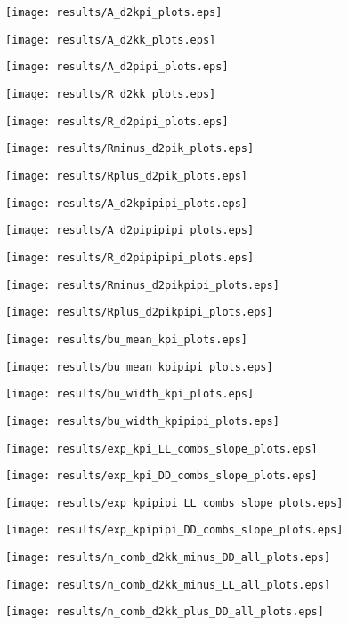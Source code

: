 \documentclass[11pt,a4paper]{article}
\begin{document}
\texttt{[image: results/A\_d2kpi\_plots.eps]}

\texttt{[image: results/A\_d2kk\_plots.eps]}

\texttt{[image: results/A\_d2pipi\_plots.eps]}

\texttt{[image: results/R\_d2kk\_plots.eps]}

\texttt{[image: results/R\_d2pipi\_plots.eps]}

\texttt{[image: results/Rminus\_d2pik\_plots.eps]}

\texttt{[image: results/Rplus\_d2pik\_plots.eps]}

\texttt{[image: results/A\_d2kpipipi\_plots.eps]}

\texttt{[image: results/A\_d2pipipipi\_plots.eps]}

\texttt{[image: results/R\_d2pipipipi\_plots.eps]}

\texttt{[image: results/Rminus\_d2pikpipi\_plots.eps]}

\texttt{[image: results/Rplus\_d2pikpipi\_plots.eps]}

\texttt{[image: results/bu\_mean\_kpi\_plots.eps]}

\texttt{[image: results/bu\_mean\_kpipipi\_plots.eps]}

\texttt{[image: results/bu\_width\_kpi\_plots.eps]}

\texttt{[image: results/bu\_width\_kpipipi\_plots.eps]}

\texttt{[image: results/exp\_kpi\_LL\_combs\_slope\_plots.eps]}

\texttt{[image: results/exp\_kpi\_DD\_combs\_slope\_plots.eps]}

\texttt{[image: results/exp\_kpipipi\_LL\_combs\_slope\_plots.eps]}

\texttt{[image: results/exp\_kpipipi\_DD\_combs\_slope\_plots.eps]}

\iffalse
\texttt{[image: results/n\_comb\_d2kk\_minus\_DD\_all\_plots.eps]}

\texttt{[image: results/n\_comb\_d2kk\_minus\_LL\_all\_plots.eps]}

\texttt{[image: results/n\_comb\_d2kk\_plus\_DD\_all\_plots.eps]}
\end{document}
